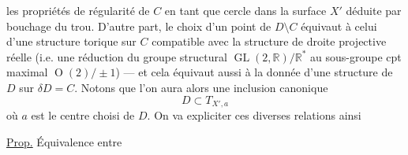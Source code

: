 les propriétés de régularité de $C$ en tant que
cercle  dans la surface  $X'$ déduite
par bouchage du trou. D'autre part,
le choix d'un point de $D\setminus C$ équivaut
à celui d'une structure torique
sur $C$ compatible avec la structure de
droite projective réelle (i.e. une réduction
du groupe structural 
$\operatorname{GL}(2,\mathbb R)/\mathbb R^*$
au sous-groupe cpt maximal $\operatorname O(2)/\pm1$)
--- et cela équivaut aussi à la donnée
d'une structure  de $D$ sur 
$\delta D=C$. Notons que l'on aura alors une
inclusion canonique
\[
D\subset T_{X',a}
\]
où $a$ est le centre choisi de $D$. On
va expliciter  ces diverses
relations ainsi

\uline{Prop.} Équivalence entre 
